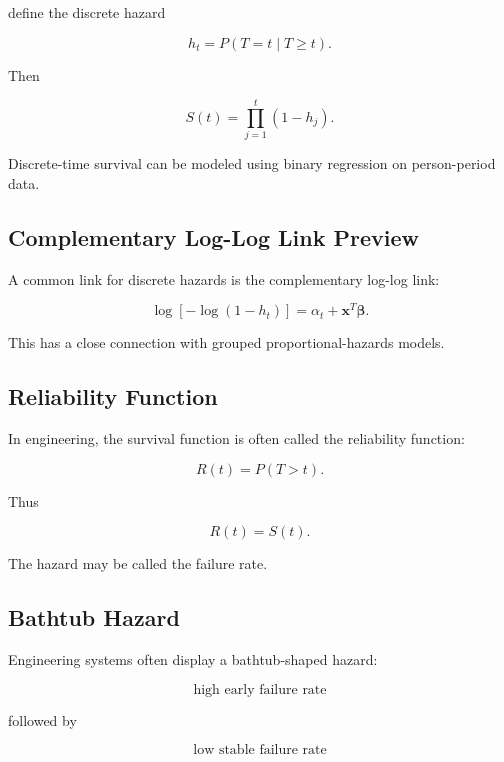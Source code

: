 define the discrete hazard

\[
\boxed{
h_t
=
P
(
T=t
\mid
T\geq t
).
}
\]

Then

\[
\boxed{
S(t)
=
\prod_{j=1}^{t}
(
1-h_j
).
}
\]

Discrete-time survival can be modeled using binary regression on
person-period data.

\subsection{Complementary Log-Log Link Preview}
\label{subsec:cloglog-survival}

A common link for discrete hazards is the complementary log-log link:

\[
\boxed{
\log
[
-\log(1-h_t)
]
=
\alpha_t
+
\mathbf{x}^T
\boldsymbol{\beta}.
}
\]

This has a close connection with grouped proportional-hazards models.

\subsection{Reliability Function}
\label{subsec:reliability-function}

In engineering, the survival function is often called the reliability
function:

\[
\boxed{
R(t)
=
P(T>t).
}
\]

Thus

\[
\boxed{
R(t)=S(t).
}
\]

The hazard may be called the failure rate.

\subsection{Bathtub Hazard}
\label{subsec:bathtub-hazard}

Engineering systems often display a bathtub-shaped hazard:

\[
\boxed{
\text{high early failure rate}
}
\]

followed by

\[
\boxed{
\text{low stable failure rate}
}
\]

